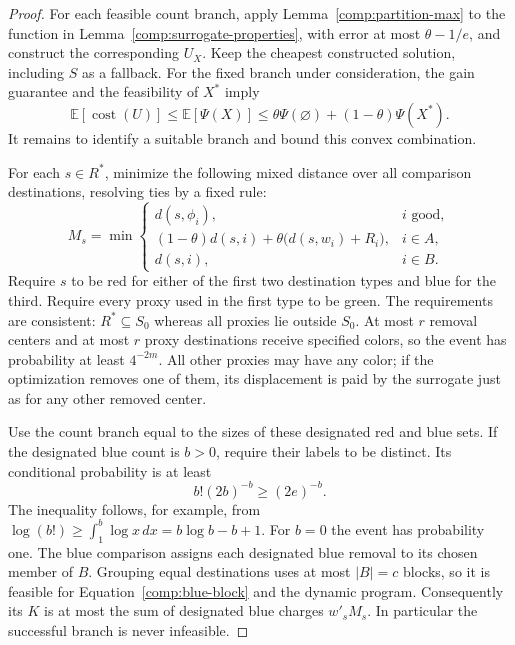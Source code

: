 \begin{proof}
For each feasible count branch, apply Lemma~\ref{comp:partition-max}
to the function in Lemma~\ref{comp:surrogate-properties}, with error
at most $\theta-1/e$, and construct the corresponding $U_X$.  Keep
the cheapest constructed solution, including $S$ as a fallback.  For
the fixed branch under consideration, the gain guarantee and the
feasibility of $X^*$ imply
\begin{equation}
 \mathbb E[\operatorname{cost}(U)]
 \le\mathbb E[\Psi(X)]
 \le\theta\Psi(\varnothing)+(1-\theta)\Psi(X^*).
 \label{comp:convex-surrogate}
\end{equation}
It remains to identify a suitable branch and bound this convex
combination.

For each $s\in R^*$, minimize the following mixed distance over all
comparison destinations, resolving ties by a fixed rule:
\begin{equation}
 M_s=\min\left\{
 \begin{array}{ll}
 d(s,\phi_i),&i\text{ good},\\
 (1-\theta)d(s,i)+\theta\bigl(d(s,w_i)+R_i\bigr),&i\in A,\\
 d(s,i),&i\in B.
 \end{array}\right.
 \label{comp:mixed-distance}
\end{equation}
Require $s$ to be red for either of the first two destination types and
blue for the third.  Require every proxy used in the first type to be
green.  The requirements are consistent: $R^*\subseteq S_0$ whereas
all proxies lie outside $S_0$.  At most $r$ removal centers and at most
$r$ proxy destinations receive specified colors, so the event has
probability at least $4^{-2m}$.  All other proxies may have any color;
if the optimization removes one of them, its displacement is paid by
the surrogate just as for any other removed center.

Use the count branch equal to the sizes of these designated red and
blue sets.  If the designated blue count is $b>0$, require their labels
to be distinct.  Its conditional probability is at least
\[
 b!(2b)^{-b}\ge(2e)^{-b}.
\]
The inequality follows, for example, from
$\log(b!)\ge\int_1^b\log x\,dx=b\log b-b+1$.
For $b=0$ the event has probability one.  The blue comparison assigns
each designated blue removal to its chosen member of $B$.  Grouping
equal destinations uses at most $|B|=c$ blocks, so it is feasible for
Equation~\eqref{comp:blue-block} and the dynamic program.  Consequently
its $K$ is at most the sum of designated blue charges $w'_sM_s$.
In particular the successful branch is never infeasible.


\end{proof}
